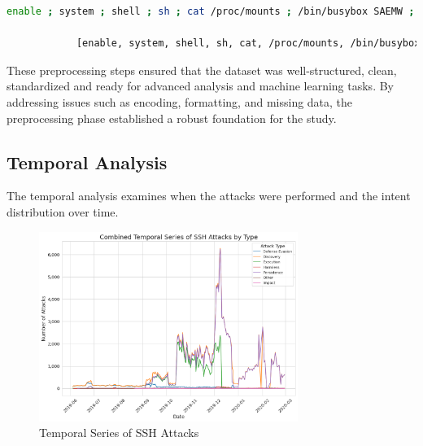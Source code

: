         \begin{lstlisting}[language=sh, caption={Dataset Processing}, label={lst:dataset-processing}]
            enable ; system ; shell ; sh ; cat /proc/mounts ; /bin/busybox SAEMW ; cd /dev/shm ; cat .s || cp /bin/echo .s ; /bin/busybox SAEMW ; tftp ; wget ; /bin/busybox SAEMW ; dd bs=52 count=1 if=.s || cat .s || while read i ; do echo $i ; done < .s ; /bin/busybox SAEMW ; rm .s ; exit ;
            
            [enable, system, shell, sh, cat, /proc/mounts, /bin/busybox, SAEMW, cd, /dev/shm, cat, .s, cp, /bin/echo, .s, /bin/busybox, SAEMW, tftp, wget , /bin/busybox, SAEMW, dd, bs, count, if, cat, .s, while, read, i, do, echo, i, done, .s, /bin/busybox, SAEMW, rm, .s, exit]
        \end{lstlisting}
        

        These preprocessing steps ensured that the dataset was well-structured, clean, standardized and ready for advanced analysis and machine learning tasks. By addressing issues such as encoding, formatting, and missing data, the preprocessing phase established a robust foundation for the study.

    \subsection{Temporal Analysis}
    
        The temporal analysis examines when the attacks were performed and the intent distribution over time.
        
        \begin{figure}[H]
            \centering
            \includegraphics[width=0.75\textwidth]{../figures/plots/section1/combined_temporal_series_of_ssh_attacks_by_type.png}
            \caption{Temporal Series of SSH Attacks}
            \label{fig:temporal-analysis}
        \end{figure}
        
